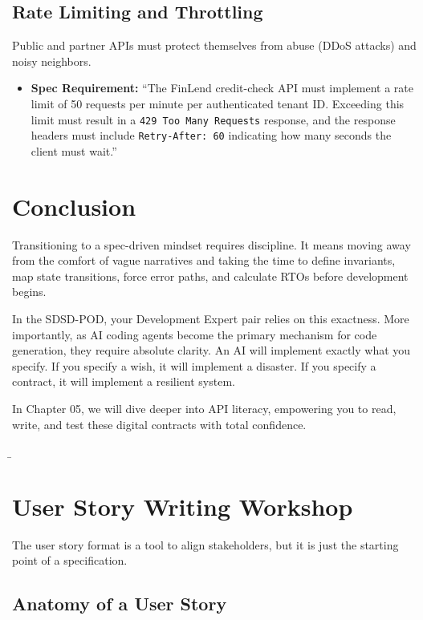 \subsection{Rate Limiting and
Throttling}\label{rate-limiting-and-throttling}

Public and partner APIs must protect themselves from abuse (DDoS
attacks) and noisy neighbors.

\begin{itemize}
\tightlist
\item
  \textbf{Spec Requirement:} ``The FinLend credit-check API must
  implement a rate limit of 50 requests per minute per authenticated
  tenant ID. Exceeding this limit must result in a
  \texttt{429\ Too\ Many\ Requests} response, and the response headers
  must include \texttt{Retry-After:\ 60} indicating how many seconds the
  client must wait.''
\end{itemize}

\section{Conclusion}\label{conclusion-2}

Transitioning to a spec-driven mindset requires discipline. It means
moving away from the comfort of vague narratives and taking the time to
define invariants, map state transitions, force error paths, and
calculate RTOs before development begins.

In the SDSD-POD, your Development Expert pair relies on this exactness.
More importantly, as AI coding agents become the primary mechanism for
code generation, they require absolute clarity. An AI will implement
exactly what you specify. If you specify a wish, it will implement a
disaster. If you specify a contract, it will implement a resilient
system.

In Chapter 05, we will dive deeper into API literacy, empowering you to
read, write, and test these digital contracts with total confidence.

\b

\section{User Story Writing Workshop}\label{user-story-writing-workshop}

The user story format is a tool to align stakeholders, but it is just
the starting point of a specification.

\subsection{Anatomy of a User Story}\label{anatomy-of-a-user-story}

